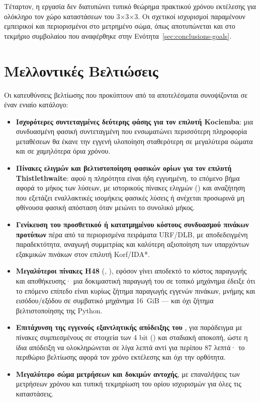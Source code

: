 Τέταρτον, η εργασία δεν διατυπώνει τυπικό θεώρημα πρακτικού χρόνου εκτέλεσης για ολόκληρο τον χώρο καταστάσεων του 3×3×3. Οι σχετικοί ισχυρισμοί παραμένουν εμπειρικοί και περιορισμένοι στο μετρημένο σώμα, όπως αποτυπώνεται και στο τεκμήριο συμβολαίου που αναφέρθηκε στην Ενότητα~\ref{sec:conclusions-goals}.

\section{Μελλοντικές Βελτιώσεις}
\label{sec:conclusions-future}

Οι κατευθύνσεις βελτίωσης που προκύπτουν από τα αποτελέσματα συνοψίζονται σε έναν ενιαίο κατάλογο:

\begin{itemize}
\item \textbf{Ισχυρότερες συντεταγμένες δεύτερης φάσης για τον επιλυτή Kociemba}: μια συνδυασμένη φασική συντεταγμένη που ενσωματώνει περισσότερη πληροφορία μεταθέσεων θα έκανε την εγγενή υλοποίηση σταθερότερη σε μεγαλύτερα σώματα και σε χαμηλότερα όρια χρόνου.
\item \textbf{Πίνακες ελιγμών και βελτιστοποίηση φασικών ορίων για τον επιλυτή Thistlethwaite}: αφού η πληρότητα είναι ήδη εγγυημένη, το επόμενο βήμα αφορά το μήκος των λύσεων, με ιστορικούς πίνακες ελιγμών () και αναζήτηση που εξετάζει εναλλακτικές ισομήκεις φασικές λύσεις ή ανέχεται προσωρινά μη φθίνουσα φασική απόσταση όταν μειώνει το συνολικό μήκος.
\item \textbf{Γενίκευση του προσθετικού ή κατατμημένου κόστους συνδυασμού πινάκων προτύπων} πέρα από τα περιορισμένα πειράματα URF/DLB, με αποδεδειγμένη παραδεκτότητα, αναγωγή συμμετρίας και καλύτερη αξιοποίηση των υπαρχόντων εξακμικών πινάκων στον επιλυτή Korf/IDA*.
\item \textbf{Μεγαλύτεροι πίνακες H48} (, ), εφόσον γίνει αποδεκτό το κόστος παραγωγής και αποθήκευσης· μια δοκιμαστική παραγωγή του  σε τοπικό μηχάνημα έδειξε ότι το επόμενο επίπεδο είναι κυρίως ζήτημα παραγωγής εγγενών πινάκων, μνήμης και εισόδου/εξόδου σε συμβατικό μηχάνημα 16~GiB --- και όχι ζήτημα βελτιστοποίησης της Python.
\item \textbf{Επιτάχυνση της εγγενούς εξαντλητικής απόδειξης του }, για παράδειγμα με πίνακες συμπιεσμένους σε στοιχεία των 4 bit () και σταδιακή αποκοπή, ώστε η ίδια απόδειξη να ολοκληρώνεται σε λίγα λεπτά αντί για περίπου 87 λεπτά· το περιθώριο βελτίωσης αφορά τον χρόνο εκτέλεσης και όχι την ορθότητα.
\item \textbf{Μεγαλύτερο σώμα μετρήσεων και δοκιμών αντοχής}, με επαναλήψεις των μετρήσεων χρόνου και τυπική τεκμηρίωση του ορίου ισχυρισμών για όλες τις καταστάσεις.
\end{itemize}

